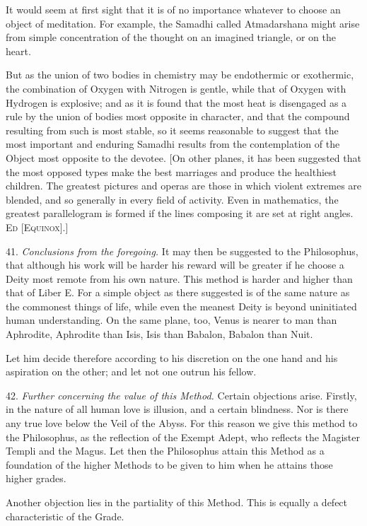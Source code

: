 It would seem at first sight that it is of no importance whatever to choose an object of meditation. For example, the Samadhi called Atmadarshana might arise from simple concentration of the thought on an imagined triangle, or on the heart.

But as the union of two bodies in chemistry may be endothermic or exothermic, the combination of Oxygen with Nitrogen is gentle, while that of Oxygen with Hydrogen is explosive; and as it is found that the most heat is disengaged as a rule by the union of bodies most opposite in character, and that the compound resulting from such is most stable, so it seems reasonable to suggest that the most important and enduring Samadhi results from the contemplation of the Object most opposite to the devotee. [On other planes, it has been suggested that the most opposed types make the best marriages and produce the healthiest children. The greatest pictures and operas are those in which violent extremes are blended, and so generally in every field of activity. Even in mathematics, the greatest parallelogram is formed if the lines composing it are set at right angles. \textsc{Ed [Equinox]}.]

41. \textit{Conclusions from the foregoing.} It may then be suggested to the Philosophus, that although his work will be harder his reward will be greater if he choose a Deity most remote from his own nature. This method is harder and higher than that of Liber E. For a simple object as there suggested is of the same nature as the commonest things of life, while even the meanest Deity is beyond uninitiated human understanding. On the same plane, too, Venus is nearer to man than Aphrodite, Aphrodite than Isis, Isis than Babalon, Babalon than Nuit.

Let him decide therefore according to his discretion on the one hand and his aspiration on the other; and let not one outrun his fellow.

42. \textit{Further concerning the value of this Method.} Certain objections arise. Firstly, in the nature of all human love is illusion, and a certain blindness. Nor is there any true love below the Veil of the Abyss. For this reason we give this method to the Philosophus, as the reflection of the Exempt Adept, who reflects the Magister Templi and the Magus. Let then the Philosophus attain this Method as a foundation of the higher Methods to be given to him when he attains those higher grades.

Another objection lies in the partiality of this Method. This is equally a defect characteristic of the Grade.

